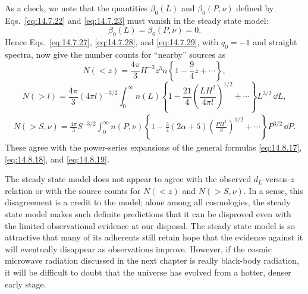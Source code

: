 As a check, we note that the quantities \(\beta_0(L)\) and
\(\beta_0(P,\nu)\) defined by Eqs.~\eqref{eq:14.7.22} and
\eqref{eq:14.7.23} must vanish in the steady state model:
\[
  \beta_0(L)=\beta_0(P,\nu)=0.
\]
Hence Eqs.~\eqref{eq:14.7.27}, \eqref{eq:14.7.28}, and
\eqref{eq:14.7.29}, with \(q_0=-1\) and straight spectra, now give the
number counts for ``nearby'' sources as
\begin{equation}
  N(<z)
  =
  \frac{4\pi}{3}H^{-3}z^3n
  \left\{
    1-\frac94z+\cdots
  \right\},
  \tag{14.8.21}\label{eq:14.8.21}
\end{equation}
\begin{equation}
  N(>l)
  =
  \frac{4\pi}{3}(4\pi l)^{-3/2}
  \int_0^\infty
  n(L)
  \left\{
    1
    -\frac{21}{4}
    \left(\frac{LH^2}{4\pi l}\right)^{1/2}
    +\cdots
  \right\}
  L^{3/2}\,\dd L,
  \tag{14.8.22}\label{eq:14.8.22}
\end{equation}
\begin{align}
  N(>S,\nu)
  =
  \frac{4\pi}{3}S^{-3/2}
  \int_0^\infty
  n(P,\nu)
  \left\{
    1
    -\frac34(2\alpha+5)
    \left(\frac{PH^2}{S}\right)^{1/2}
    +\cdots
  \right\}
  P^{3/2}\,\dd P.
  \tag{14.8.23}\label{eq:14.8.23}
\end{align}
These agree with the power-series expansions of the general formulas
\eqref{eq:14.8.17}, \eqref{eq:14.8.18}, and \eqref{eq:14.8.19}.

The steady state model does not appear to agree with the observed
\(d_L\)-versus-\(z\) relation or with the source counts for \(N(<z)\) and
\(N(>S,\nu)\). In a sense, this disagreement is a credit to the model; alone
among all cosmologies, the steady state model makes such definite predictions
that it can be disproved even with the limited observational evidence at our
disposal. The steady state model is so attractive that many of its adherents
still retain hope that the evidence against it will eventually disappear as
observations improve. However, if the cosmic microwave radiation discussed
in the next chapter is really black-body radiation, it will be difficult to
doubt that the universe has evolved from a hotter, denser early stage.
